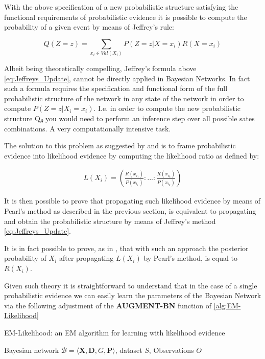 \documentclass[11pt]{article}
\begin{document}
\begin{article}
With the above specification of a new probabilistic structure
satisfying the functional requirements of probabilistic evidence it
is possible to compute the probability of a given event by means of
Jeffrey's rule:

\begin{equation} \label{eq:Jeffreys_Update}
 Q(Z = z) = \sum_{x_i \in Val(X_i)} P(Z = z | X = x_i) R(X = x_i)
\end{equation}

Albeit being theoretically compelling, Jeffrey's formula above
\ref{eq:Jeffreys_Update}, cannot be directly applied in Bayesian
Networks. In fact such a formula requires the specification and
functional form of the full probabilistic structure of the network
in any state of the network in order to compute \(P(Z = z | X_i =
  x_i)\). I.e. in order to compute the new probabilistic structure
Q\textsubscript{\(\theta\)} you would need to perform an inference step over all
possible sates combinations. A very computationally intensive task.

The solution to this problem as suggested by \cite{Chan_2005} and
\cite{PENG_2010} is to frame probabilistic evidence into likelihood
evidence by computing the likelihood ratio as defined by:

\begin{align} \label{eq:probabilistic-to-likelihood-evidence}
 L(X_i) = (\frac{R(x_{i_1})}{P(x_{i_1})}: ... : \frac{R(x_{i_k})}{P(x_{i_k})})
\end{align}

It is then possible to prove that propagating such likelihood
evidence by means of Pearl's method as described in the previous
section, is equivalent to propagating and obtain the probabilistic
structure by means of Jeffrey's method \ref{eq:Jeffreys_Update}.

It is in fact possible to prove, as in \cite{PENG_2010}, that with
such an approach the posterior probability of \(X_i\) after propagating
\(L(X_i)\) by Pearl’s method, is equal to \(R(X_i)\).

Given such theory it is straightforward to understand that
in the case of a single probabilistic evidence we can easily learn
the parameters of the Bayesian Network via the following adjustment
of the \textbf{AUGMENT-BN} function of \ref{alg:EM-Likelihood}

\algrenewcommand\algorithmicindent{1.5em}%

\begin{algorithm*}[h!]
\caption{EM-Likelihood: an EM algorithm for learning with likelihood evidence}
\label{alg:EM-Probabilistic-Evidence}
\vspace{-10pt}
\begin{multicols}{2}
\begin{algorithmic}[1] 
\Require Bayesian network $\mathcal{B}=\langle \mathbf{X},\mathbf{D}, G, \mathbf{P} \rangle$, dataset $S$, Observations $O$


\end{algorithmic}
\end{multicols}
\end{algorithm*}
\end{article}
\end{document}
